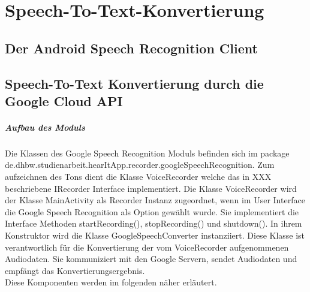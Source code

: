 \chapter{Speech-To-Text-Konvertierung}


\section{Der Android Speech Recognition Client}


\section{Speech-To-Text Konvertierung durch die Google Cloud API}
\paragraph{Aufbau des Moduls}
Die Klassen des Google Speech Recognition Moduls befinden sich im package de.dhbw.studienarbeit.hearItApp.recorder.googleSpeechRecognition. Zum aufzeichnen des Tons dient die Klasse VoiceRecorder welche das in XXX beschriebene IRecorder Interface implementiert. Die Klasse VoiceRecorder wird der Klasse MainActivity als Recorder Instanz zugeordnet, wenn im User Interface die Google Speech Recognition als Option gewählt wurde. Sie implementiert die Interface Methoden startRecording(), stopRecording() und shutdown(). In ihrem Konstruktor wird die Klasse GoogleSpeechConverter instanziiert. Diese Klasse ist verantwortlich für die Konvertierung der vom VoiceRecorder aufgenommenen Audiodaten. Sie kommuniziert mit den Google Servern, sendet Audiodaten und empfängt das Konvertierungsergebnis.\\
Diese Komponenten werden im folgenden näher erläutert.
\\


